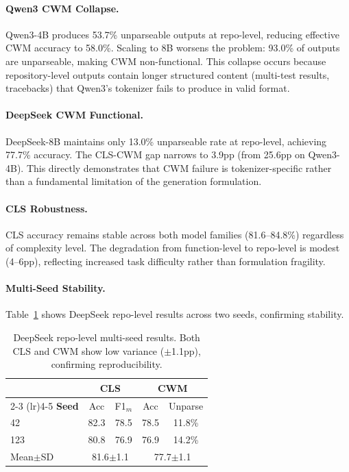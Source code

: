 \documentclass[11pt,a4paper]{article}
\begin{document}
\paragraph{Qwen3 CWM Collapse.} Qwen3-4B produces 53.7\% unparseable outputs at repo-level, reducing effective CWM accuracy to 58.0\%. Scaling to 8B worsens the problem: 93.0\% of outputs are unparseable, making CWM non-functional. This collapse occurs because repository-level outputs contain longer structured content (multi-test results, tracebacks) that Qwen3's tokenizer fails to produce in valid format.

\paragraph{DeepSeek CWM Functional.} DeepSeek-8B maintains only 13.0\% unparseable rate at repo-level, achieving 77.7\% accuracy. The CLS-CWM gap narrows to 3.9pp (from 25.6pp on Qwen3-4B). This directly demonstrates that CWM failure is tokenizer-specific rather than a fundamental limitation of the generation formulation.

\paragraph{CLS Robustness.} CLS accuracy remains stable across both model families (81.6--84.8\%) regardless of complexity level. The degradation from function-level to repo-level is modest (4--6pp), reflecting increased task difficulty rather than formulation fragility.

\paragraph{Multi-Seed Stability.} Table~\ref{tab:seeds} shows DeepSeek repo-level results across two seeds, confirming stability.

\begin{table}[t]
\centering
\small
\begin{tabular}{lcccc}
\toprule
& \multicolumn{2}{c}{\textbf{CLS}} & \multicolumn{2}{c}{\textbf{CWM}} \\
\cmidrule(lr){2-3} \cmidrule(lr){4-5}
\textbf{Seed} & Acc & F1$_m$ & Acc & Unparse \\
\midrule
42 & 82.3 & 78.5 & 78.5 & 11.8\% \\
123 & 80.8 & 76.9 & 76.9 & 14.2\% \\
\midrule
Mean$\pm$SD & \multicolumn{2}{c}{81.6$\pm$1.1} & \multicolumn{2}{c}{77.7$\pm$1.1} \\
\bottomrule
\end{tabular}
\caption{DeepSeek repo-level multi-seed results. Both CLS and CWM show low variance ($\pm$1.1pp), confirming reproducibility.}
\label{tab:seeds}
\end{table}
\end{document}
